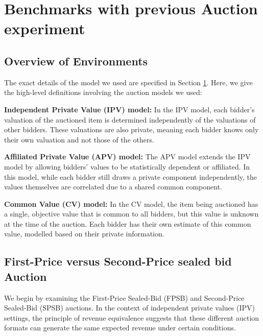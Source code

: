 \documentclass{article} %
\begin{document}


\section{Benchmarks with previous Auction experiment}\label{results}


\subsection{Overview of Environments}
The exact details of the model we used are specified in Section \ref{results}. Here, we give the high-level definitions involving the auction models we used: 

\textbf{Independent Private Value (IPV) model:} In the IPV model, each bidder's valuation of the auctioned item is determined independently of the valuations of other bidders. 
These valuations are also private, meaning each bidder knows only their own valuation and not those of the others.


\textbf{Affiliated Private Value (APV) model:} The APV model extends the IPV model by allowing bidders' values to be statistically dependent or affiliated. 
In this model, while each bidder still draws a private component independently, the values themselves are correlated due to a shared common component.


\textbf{Common Value (CV) model:} In the CV model, the item being auctioned has a single, objective value that is common to all bidders, but this value is unknown at the time of the auction. 
Each bidder has their own estimate of this common value, modelled based on their private information. 

\subsection{First-Price versus Second-Price sealed bid Auction }\label{section:classic}

We begin by examining the First-Price Sealed-Bid (FPSB) and Second-Price Sealed-Bid (SPSB) auctions. 
In the context of independent private values (IPV) settings, the principle of revenue equivalence suggests that these different auction formats can generate the same expected revenue under certain conditions.
\end{document}

